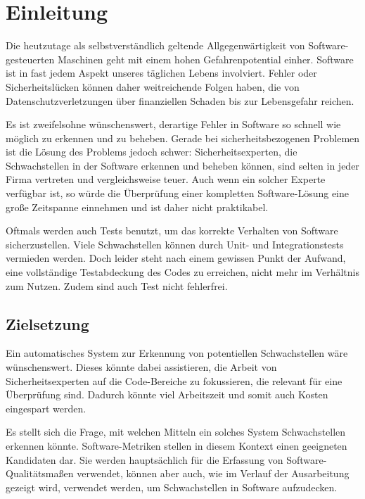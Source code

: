 \section{Einleitung}
\label{sec:einleitung}
Die heutzutage als selbstverständlich geltende Allgegenwärtigkeit von Software-gesteuerten Maschinen geht mit einem hohen Gefahrenpotential einher.
Software ist in fast jedem Aspekt unseres täglichen Lebens involviert.
Fehler oder Sicherheitslücken können daher weitreichende Folgen haben, die von Datenschutzverletzungen über finanziellen Schaden bis zur Lebensgefahr reichen.

Es ist zweifelsohne wünschenswert, derartige Fehler in Software so schnell wie möglich zu erkennen und zu beheben.
Gerade bei sicherheitsbezogenen Problemen ist die Lösung des Problems jedoch schwer:
Sicherheitsexperten, die Schwachstellen in der Software erkennen und beheben können, sind selten in jeder Firma vertreten und vergleichsweise teuer.
Auch wenn ein solcher Experte verfügbar ist, so würde die Überprüfung einer kompletten Software-Lösung eine große Zeitspanne einnehmen und ist daher nicht praktikabel.

Oftmals werden auch Tests benutzt, um das korrekte Verhalten von Software sicherzustellen.
Viele Schwachstellen können durch Unit- und Integrationstests vermieden werden.
Doch leider steht nach einem gewissen Punkt der Aufwand, eine vollständige Testabdeckung des Codes zu erreichen, nicht mehr im Verhältnis zum Nutzen.
Zudem sind auch Test nicht fehlerfrei.

\subsection{Zielsetzung}
Ein automatisches System zur Erkennung von potentiellen Schwachstellen wäre wünschenswert.
Dieses könnte dabei assistieren, die Arbeit von Sicherheitsexperten auf die Code-Bereiche zu fokussieren, die relevant für eine Überprüfung sind.
Dadurch könnte viel Arbeitszeit und somit auch Kosten eingespart werden.

Es stellt sich die Frage, mit welchen Mitteln ein solches System Schwachstellen erkennen könnte.
Software-Metriken stellen in diesem Kontext einen geeigneten Kandidaten dar.
Sie werden hauptsächlich für die Erfassung von Software-Qualitätsmaßen verwendet, können aber auch, wie im Verlauf der Ausarbeitung gezeigt wird, verwendet werden, um Schwachstellen in Software aufzudecken.
